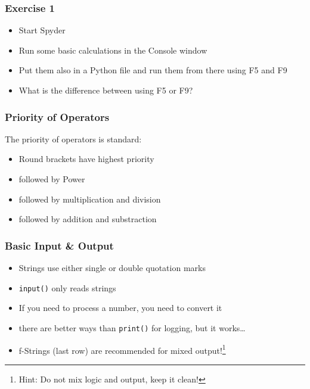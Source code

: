\documentclass[english]{beamer}
\begin{document}
\begin{frame}
\frametitle{Exercise 1}


\begin{itemize}
\item Start Spyder
\item Run some basic calculations in the Console window
\item Put them also in a Python file and run them from there using F5 and F9
\item What is the difference between using F5 or F9?
\end{itemize}
\end{frame}



\begin{frame}
\frametitle{Priority of Operators}

The priority of operators is standard:

\begin{itemize}
\item Round brackets have highest priority
\item followed by Power
\item followed by multiplication and division
\item followed by addition and substraction
\end{itemize}


\end{frame}

\begin{frame}[fragile]
\frametitle{Basic Input \& Output}



\begin{itemize}
	\item Strings use either single or double quotation marks
	\item \lstinline[style=Python]{input()} only reads strings	
	\item If you need to process a number, you need to convert it 
	\item there are better ways than \lstinline[style=Python]{print()} for logging, but it works\ldots 
	\item f-Strings (last row) are recommended for mixed output!\footnote{Hint: Do not mix logic and output, keep it clean!}
	\end{itemize}
\end{frame}
\end{document}
